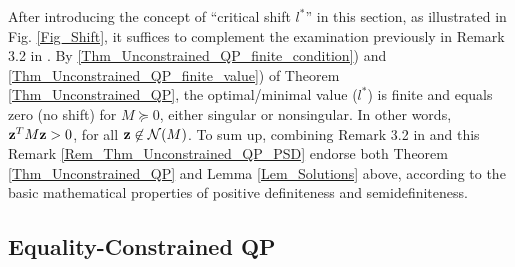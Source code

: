 \documentclass{imaman}
\newcommand{\bfz}{{\bf z}}
\newcommand{\calN}{{\mathcal N}}
\numberwithin{equation}{section}
\begin{document}
\begin{remark}
After introducing the concept of ``critical shift $l^*$'' in this section, as illustrated in Fig. \ref{Fig_Shift}, it suffices to complement the examination previously in Remark 3.2 in \cite{LiLiHs:20}. By \ref{Thm_Unconstrained_QP_finite_condition}) and \ref{Thm_Unconstrained_QP_finite_value}) of Theorem \ref{Thm_Unconstrained_QP}, the optimal/minimal value ($l^*$) is finite and equals zero (no shift) for $M\succeq 0$, either singular or nonsingular. In other words, $\bfz^TM\bfz>0$, for all $\bfz\not\in\calN(M)$. To sum up, combining Remark 3.2 in \cite{LiLiHs:20} and this Remark \ref{Rem_Thm_Unconstrained_QP_PSD} endorse both Theorem \ref{Thm_Unconstrained_QP} and Lemma \ref{Lem_Solutions} above, according to the basic mathematical properties of positive definiteness and semidefiniteness.
\label{Rem_Thm_Unconstrained_QP_PSD}
\end{remark}

\subsection{Equality-Constrained QP}
\label{Subsec_Equality_QP}
\end{document}
